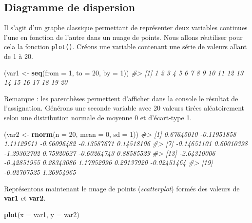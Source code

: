 \documentclass[]{article}
\newenvironment{Shaded}{\begin{snugshade}}{\end{snugshade}}
\newcommand{\CommentTok}[1]{\textcolor[rgb]{0.56,0.35,0.01}{\textit{#1}}}
\newcommand{\DataTypeTok}[1]{\textcolor[rgb]{0.13,0.29,0.53}{#1}}
\newcommand{\DecValTok}[1]{\textcolor[rgb]{0.00,0.00,0.81}{#1}}
\newcommand{\KeywordTok}[1]{\textcolor[rgb]{0.13,0.29,0.53}{\textbf{#1}}}
\newcommand{\NormalTok}[1]{#1}
\newcommand{\StringTok}[1]{\textcolor[rgb]{0.31,0.60,0.02}{#1}}
\begin{document}
\hypertarget{diagramme-de-dispersion}{%
\subsection{Diagramme de dispersion}\label{diagramme-de-dispersion}}

Il s'agit d'un graphe classique permettant de représenter deux variables continues l'une en fonction de l'autre dans un nuage de points. Nous allons réutiliser pour cela la fonction \texttt{plot()}.
Créons une variable contenant une série de valeurs allant de 1 à 20.

\begin{Shaded}
\begin{Highlighting}[]
\NormalTok{(var1 <-}\StringTok{ }\KeywordTok{seq}\NormalTok{(}\DataTypeTok{from =} \DecValTok{1}\NormalTok{, }\DataTypeTok{to =} \DecValTok{20}\NormalTok{, }\DataTypeTok{by =} \DecValTok{1}\NormalTok{))}
\CommentTok{#>  [1]  1  2  3  4  5  6  7  8  9 10 11 12 13 14 15 16 17 18 19 20}
\end{Highlighting}
\end{Shaded}

Remarque : les parenthèses permettent d'afficher dans la console le résultat de l'assignation. Générons une seconde variable avec 20 valeurs tirées aléatoirement selon une distribution normale de moyenne 0 et d'écart-type 1.

\begin{Shaded}
\begin{Highlighting}[]
\NormalTok{(var2 <-}\StringTok{ }\KeywordTok{rnorm}\NormalTok{(}\DataTypeTok{n =} \DecValTok{20}\NormalTok{, }\DataTypeTok{mean =} \DecValTok{0}\NormalTok{, }\DataTypeTok{sd =} \DecValTok{1}\NormalTok{))}
\CommentTok{#>  [1]  0.67645010 -0.11951858  1.11129611 -0.66096482 -0.13587671  0.14518106}
\CommentTok{#>  [7] -0.14651101  0.60010398 -1.29302702  0.75920627 -0.60264743  0.88585529}
\CommentTok{#> [13] -2.64310006 -0.42851955  0.28343086  1.17952996  0.29137920 -0.02451464}
\CommentTok{#> [19] -0.02707525  1.26954965}
\end{Highlighting}
\end{Shaded}

Représentons maintenant le nuage de points (\emph{scatterplot}) formés des valeurs de \textbf{var1} et \textbf{var2}.

\begin{Shaded}
\begin{Highlighting}[]
\KeywordTok{plot}\NormalTok{(}\DataTypeTok{x =}\NormalTok{ var1, }\DataTypeTok{y =}\NormalTok{ var2)}
\end{Highlighting}
\end{Shaded}
\end{document}
